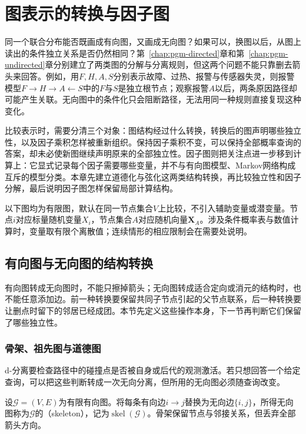\chapter{图表示的转换与因子图}
\label{chap:pgm-representations}

同一个联合分布能否既画成有向图，又画成无向图？如果可以，换图以后，从图上读出的条件独立关系是否仍然相同？第~\ref{chap:pgm-directed}章和第~\ref{chap:pgm-undirected}章分别建立了两类图的分解与分离规则，但这两个问题不能只靠删去箭头来回答。例如，用$F,H,A,S$分别表示故障、过热、报警与传感器失灵，则报警模型$F\to H\to A\leftarrow S$中的$F$与$S$是独立根节点；观察报警$A$以后，两条原因路径却可能产生关联。无向图中的条件化只会阻断路径，无法用同一种规则直接复现这种变化。

比较表示时，需要分清三个对象：图结构经过什么转换，转换后的图声明哪些独立性，以及因子乘积怎样被重新组织。保持因子乘积不变，可以保持全部概率查询的答案，却未必使新图继续声明原来的全部独立性。因子图则把关注点进一步移到计算上：它显式记录每个因子需要哪些变量，并不与有向图模型、Markov网络构成互斥的模型分类。本章先建立道德化与弦化这两类结构转换，再比较独立性和因子分解，最后说明因子图怎样保留局部计算结构。

以下图均为有限图，默认在同一节点集合$V$上比较，不引入辅助变量或潜变量。节点$i$对应标量随机变量$X_i$，节点集合$A$对应随机向量$\bm{X}_A$。涉及条件概率表与数值计算时，变量取有限个离散值；连续情形的相应限制会在需要处说明。

\section{有向图与无向图的结构转换}
\label{sec:pgm-representations-structural-conversions}

有向图转成无向图时，不能只擦掉箭头；无向图转成适合定向或消元的结构时，也不能任意添加边。前一种转换要保留共同子节点引起的父节点联系，后一种转换要让删点时留下的邻居已经成团。本节先定义这些操作本身，下一节再判断它们保留了哪些独立性。

\subsection{骨架、祖先图与道德图}
\label{sec:pgm-representations-ancestral-graphs}

d-分离要检查路径中的碰撞点是否被自身或后代的观测激活。若只想回答一个给定查询，可以把这些判断转成一次无向分离，但所用的无向图必须随查询改变。

\begin{definition}[骨架]
  \label{def:pgm-representations-skeleton}
  设$\mathcal{G}=(V,E)$为有限有向图。将每条有向边$i\to j$替换为无向边$\{i,j\}$，所得无向图称为$\mathcal{G}$的（skeleton），记为$\operatorname{skel}(\mathcal{G})$。骨架保留节点与邻接关系，但丢弃全部箭头方向。
\end{definition}

